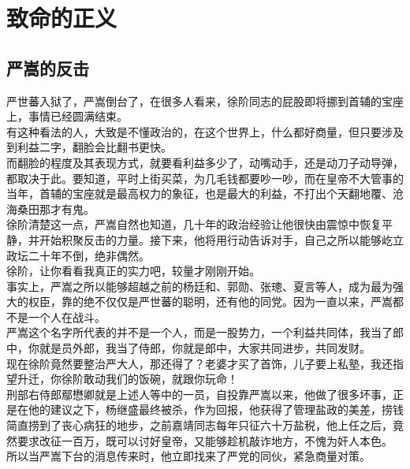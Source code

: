 \section{致命的正义}
\ifnum{}
	\begin{multicols}{\theparacolNo}
\fi
\subsection{严嵩的反击}
严世蕃入狱了，严嵩倒台了，在很多人看来，徐阶同志的屁股即将挪到首辅的宝座上，事情已经圆满结束。\\

有这种看法的人，大致是不懂政治的，在这个世界上，什么都好商量，但只要涉及到利益二字，翻脸会比翻书更快。\\

而翻脸的程度及其表现方式，就要看利益多少了，动嘴动手，还是动刀子动导弹，都取决于此。要知道，平时上街买菜，为几毛钱都要吵一吵，而在皇帝不大管事的当年，首辅的宝座就是最高权力的象征，也是最大的利益，不打出个天翻地覆、沧海桑田那才有鬼。\\

徐阶清楚这一点，严嵩自然也知道，几十年的政治经验让他很快由震惊中恢复平静，并开始积聚反击的力量。接下来，他将用行动告诉对手，自己之所以能够屹立政坛二十年不倒，绝非偶然。\\

徐阶，让你看看我真正的实力吧，较量才刚刚开始。\\

事实上，严嵩之所以能够超越之前的杨廷和、郭勋、张璁、夏言等人，成为最为强大的权臣，靠的绝不仅仅是严世蕃的聪明，还有他的同党。因为一直以来，严嵩都不是一个人在战斗。\\

严嵩这个名字所代表的并不是一个人，而是一股势力，一个利益共同体，我当了郎中，你就是员外郎，我当了侍郎，你就是郎中，大家共同进步，共同发财。\\

现在徐阶竟然要整治严大人，那还得了？老婆才买了首饰，儿子要上私塾，我还指望升迁，你徐阶敢动我们的饭碗，就跟你玩命！\\

刑部右侍郎鄢懋卿就是上述人等中的一员，自投靠严嵩以来，他做了很多坏事，正是在他的建议之下，杨继盛最终被杀，作为回报，他获得了管理盐政的美差，捞钱简直捞到了丧心病狂的地步，之前嘉靖同志每年只征六十万盐税，他上任之后，竟然要求改征一百万，既可以讨好皇帝，又能够趁机敲诈地方，不愧为奸人本色。\\

所以当严嵩下台的消息传来时，他立即找来了严党的同伙，紧急商量对策。\\


\end{multicols}
